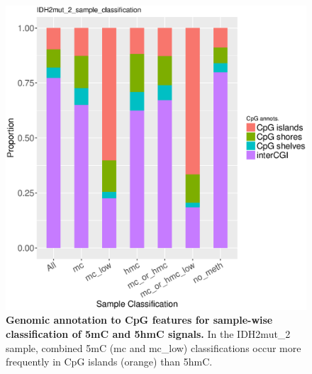 \begin{figure}[ht!]
\centering
\includegraphics[width=1\textwidth]{chap5figs/figure5_14.eps}
\caption[Genomic annotation to CpG features for sample-wise classification of 5mC and 5hmC signals.]
{
\textbf{Genomic annotation to CpG features for sample-wise classification of 5mC and 5hmC signals.} In the IDH2mut\_2 sample, combined 5mC (mc and mc\_low) classifications occur more frequently in CpG islands (orange) than 5hmC.
}
\label{chap5:fig:14}
\end{figure}

\newpage

